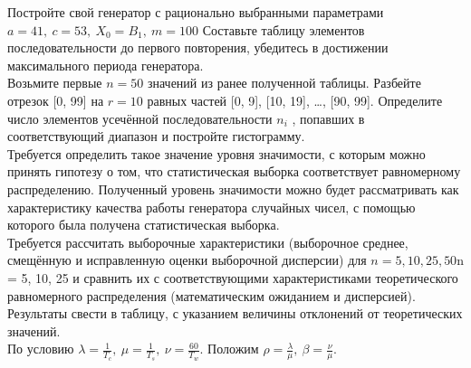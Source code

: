 \documentclass{article}
\begin{document}
Постройте свой генератор с рационально выбранными параметрами \begin{math}a = 41, \ c = 53,\ X_0 = B_1,\ m = 100\end{math} Составьте таблицу элементов
последовательности до первого повторения, убедитесь в достижении
максимального периода генератора.
\vspace{\baselineskip}
\\
Возьмите первые \begin{math}n = 50\end{math} значений из ранее полученной таблицы. Разбейте отрезок [0, 99] на \begin{math}r = 10\end{math} равных частей [0, 9], [10, 19], …, [90,  99]. Определите число элементов усечённой последовательности \begin{math}n_i\end{math} , попавших в соответствующий диапазон и постройте гистограмму.
\vspace{\baselineskip}
\\Требуется определить такое значение уровня значимости, с
которым можно принять гипотезу о том, что статистическая выборка
соответствует равномерному распределению. Полученный уровень
значимости можно будет рассматривать как характеристику качества работы
генератора случайных чисел, с помощью которого была получена
статистическая выборка.
\vspace{\baselineskip}
\\
Требуется рассчитать выборочные характеристики (выборочное среднее,
смещённую и исправленную оценки выборочной дисперсии) для \begin{math}n = 5, 10, 25, 50\end{math}n = 5, 10, 25
 и сравнить их с соответствующими характеристиками теоретического
равномерного распределения (математическим ожиданием и дисперсией).
Результаты свести в таблицу, с указанием величины отклонений от
теоретических значений.
\newpage
\noindent\textbf {}
\vspace{\baselineskip}
\\
По условию \begin{math} \lambda = \displaystyle\frac{1}{T_c}, \ \mu = \displaystyle\frac{1}{T_s}, \ \nu = \displaystyle\frac{60}{T_w}\end{math}. Положим \begin{math}\rho = \displaystyle\frac{\lambda}{\mu}, \ \beta = \displaystyle\frac{\nu}{\mu}\end{math}.
\end{document}
